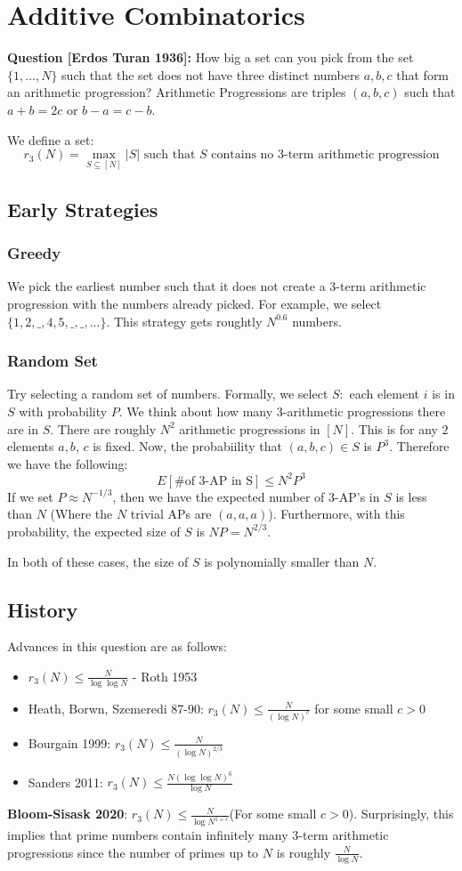 \documentclass[11pt]{article}
\theoremstyle{definition}
\begin{document}
\section{Additive Combinatorics}
\textbf{Question [Erdos Turan 1936]:} How big a set can you pick from the set $\{1, \ldots, N\}$ such that the set does not have three distinct numbers $a,b,c$ that form an arithmetic progression? Arithmetic Progressions are triples $(a,b,c)$ such that $a+b=2c$ or $b-a = c-b$.
\bigskip

We define a set:
$$r_3(N) = \max_{S \subseteq [N]} |S| \text{ such that } S \text{ contains no 3-term arithmetic progression}$$
\subsection{Early Strategies}
\subsubsection{Greedy}
We pick the earliest number such that it does not create a 3-term arithmetic progression with the numbers already picked. For example, we select $\{1,2, \_, 4, 5, \_, \_,...\}$. This strategy gets roughtly $N^{0.6}$ numbers.
\subsubsection{Random Set}
Try selecting a random set of numbers. Formally, we select $S:$ each element $i$ is in $S$ with probability $P$. We think about how many 3-arithmetic progressions there are in $S$. There are roughly $N^2$ arithmetic progressions in $[N]$. This is for any $2$ elements $a,b$, $c$ is fixed. Now, the probabiility that $(a,b,c) \in S$ is $P^3$. Therefore we have the following:
$$E[\text{\# of 3-AP in S}] \leq N^2 P^3$$
If we set $P \approx N^{-1/3}$, then we have the expected number of 3-AP's in $S$ is less than $N$ (Where the $N$ trivial APs are $(a,a,a)$). Furthermore, with this probability, the expected size of $S$ is $NP = N^{2/3}$. 
\bigskip

In both of these cases, the size of $S$ is polynomially smaller than $N$.

\subsection{History}
Advances in this question are as follows:
\begin{itemize}
    \item $r_3(N) \leq \frac{N}{\log \log N}$ - Roth 1953
    \item Heath, Borwn, Szemeredi 87-90: $r_3(N) \leq \frac{N}{(\log N)^c}$ for some small $c>0$
    \item Bourgain 1999: $r_3(N) \leq \frac{N}{(\log N)^{2/3}}$
    \item Sanders 2011: $r_3(N) \leq \frac{N(\log \log N)^6}{\log N}$
\end{itemize}
\bigskip
\textbf{Bloom-Sisask 2020}: $r_3(N) \leq \frac{N}{\log N^{1+c}}$(For some small $c>0$). Surprisingly, this implies that prime numbers contain infinitely many 3-term arithmetic progressions since the number of primes up to $N$ is roughly $\frac{N}{\log N}$.
\bigskip
\end{document}
